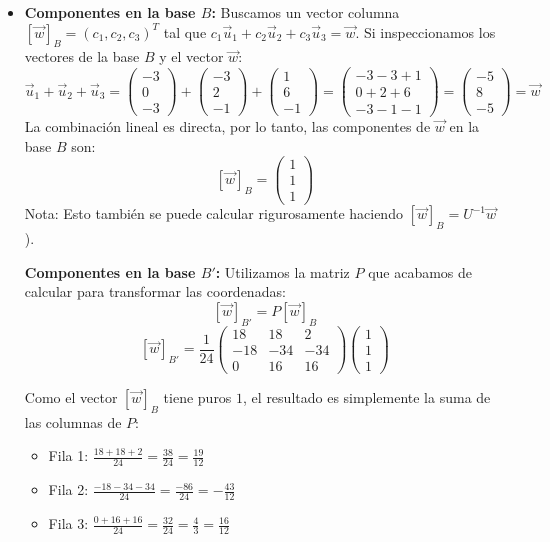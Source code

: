 \documentclass[11pt,spanish]{article}
\begin{document}
\begin{itemize}
\item[b)]
{\bf Componentes en la base $B$:}
Buscamos un vector columna $[\vec{w}]_B = (c_1, c_2, c_3)^T$ tal que $c_1\vec{u}_1 + c_2\vec{u}_2 + c_3\vec{u}_3 = \vec{w}$. 
Si inspeccionamos los vectores de la base $B$ y el vector $\vec{w}$:
$$\vec{u}_1 + \vec{u}_2 + \vec{u}_3 = \begin{pmatrix}-3 \\ 0 \\ -3\end{pmatrix} + \begin{pmatrix}-3 \\ 2 \\ -1\end{pmatrix} + \begin{pmatrix}1 \\ 6 \\ -1\end{pmatrix} = \begin{pmatrix}-3-3+1 \\ 0+2+6 \\ -3-1-1\end{pmatrix} = \begin{pmatrix}-5 \\ 8 \\ -5\end{pmatrix} = \vec{w}$$
La combinación lineal es directa, por lo tanto, las componentes de $\vec{w}$ en la base $B$ son:
$$[\vec{w}]_B = \begin{pmatrix} 1 \\ 1 \\ 1 \end{pmatrix}$$
Nota: Esto también se puede calcular rigurosamente haciendo $[\vec{w}]_B = U^{-1} \vec{w}$).

{\bf Componentes en la base $B'$:}
Utilizamos la matriz $P$ que acabamos de calcular para transformar las coordenadas:
$$[\vec{w}]_{B'} = P [\vec{w}]_B$$
$$[\vec{w}]_{B'} = \frac{1}{24} \begin{pmatrix} 18 & 18 & 2 \\ -18 & -34 & -34 \\ 0 & 16 & 16 \end{pmatrix} \begin{pmatrix} 1 \\ 1 \\ 1 \end{pmatrix}$$

Como el vector $[\vec{w}]_B$ tiene puros $1$, el resultado es simplemente la suma de las columnas de $P$:
\begin{itemize}
\item Fila 1: $\frac{18 + 18 + 2}{24} = \frac{38}{24} = \frac{19}{12}$
\item Fila 2: $\frac{-18 - 34 - 34}{24} = \frac{-86}{24} = -\frac{43}{12}$
\item Fila 3: $\frac{0 + 16 + 16}{24} = \frac{32}{24} = \frac{4}{3} = \frac{16}{12}$
\end{itemize}


\end{itemize}
\end{document}
